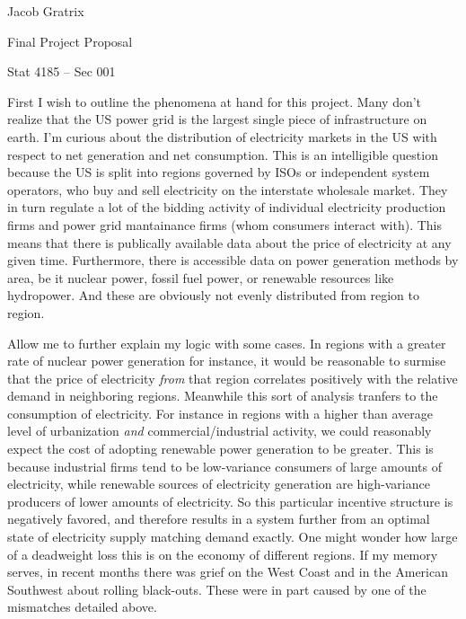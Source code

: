 \documentclass{article}
\begin{document}
\begin{minipage}{0.295\textwidth}
    Jacob Gratrix \hfill
    \raggedright
\end{minipage}
\begin{minipage}{0.4\textwidth}
    \centering
    \Large
    Final Project Proposal
\end{minipage}
\begin{minipage}{0.295\textwidth}
    \raggedleft
    Stat 4185 -- Sec 001 \hfill
\end{minipage}

\vspace{0.2in}

\par First I wish to outline the phenomena at hand for this project. 
Many don't realize that the US power grid is the largest single piece of infrastructure on earth. 
I'm curious about the distribution of electricity markets in the US with respect to net generation and net consumption. 
This is an intelligible question because the US is split into regions governed by ISOs or independent system operators, who buy and sell electricity on the interstate wholesale market. 
They in turn regulate a lot of the bidding activity of individual electricity production firms and power grid mantainance firms (whom consumers interact with). 
This means that there is publically available data about the price of electricity at any given time. 
Furthermore, there is accessible data on power generation methods by area, be it nuclear power, fossil fuel power, or renewable resources like hydropower. 
And these are obviously not evenly distributed from region to region. 


\par Allow me to further explain my logic with some cases. 
In regions with a greater rate of nuclear power generation for instance, it would be reasonable to surmise that the price of electricity \textit{from} that region correlates positively with the relative demand in neighboring regions.
Meanwhile this sort of analysis tranfers to the consumption of electricity. 
For instance in regions with a higher than average level of urbanization \textit{and} commercial/industrial activity, we could reasonably expect the cost of adopting renewable power generation to be greater. 
This is because industrial firms tend to be low-variance consumers of large amounts of electricity, while renewable sources of electricity generation are high-variance producers of lower amounts of electricity. 
So this particular incentive structure is negatively favored, and therefore results in a system further from an optimal state of electricity supply matching demand exactly. 
One might wonder how large of a deadweight loss this is on the economy of different regions. 
If my memory serves, in recent months there was grief on the West Coast and in the American Southwest about rolling black-outs. 
These were in part caused by one of the mismatches detailed above. 
\end{document}
